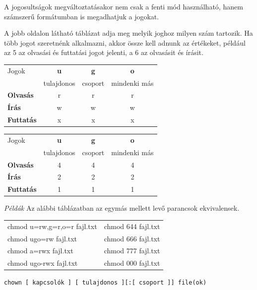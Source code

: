 A jogosultságok  megváltoztatásakor nem csak a fenti mód használható, hanem számszerű formátumban  is megadhatjuk a jogokat. 

A jobb oldalon látható táblázat adja meg melyik joghoz milyen szám tartozik. Ha több jogot szeretnénk alkalmazni, akkor össze kell adnunk az értékeket, például az 5 az olvasási és futtatási jogot jelenti, a 6 az olvasásit és írásit. 
\begin{center}
\small
\begin{tabular}{lccc}
\toprule
	Jogok 	&\bf u 		&\bf g 		&\bf o\\
	 	&tulajdonos 	&csoport	&mindenki más\\
\midrule
\bf Olvasás 	&r 		&r		&r\\
\bf Írás	&w 		&w 		&w\\
\bf Futtatás 	&x 		&x 		&x\\
\bottomrule

\end{tabular}
\hfill
\begin{tabular}{lccc}
\toprule
	Jogok 	&\bf u 		&\bf g 		&\bf o\\
	 	&tulajdonos 	&csoport	&mindenki más\\
\midrule
\bf Olvasás 	&4 		&4 		&4\\
\bf Írás	&2 		&2 		&2\\
\bf Futtatás 	&1 		&1 		&1\\
\bottomrule
\end{tabular}
\end{center}

\bigskip

\textit{Példák}
Az alábbi táblázatban az egymás mellett levő parancsok ekvivalensek.
\begin{center}
\begin{tabular}{l|l}
\toprule
chmod u=rw,g=r,o=r fajl.txt	& chmod 644 fajl.txt\\
chmod ugo=rw fajl.txt		& chmod 666 fajl.txt\\
chmod a=rwx fajl.txt		& chmod 777 fajl.txt\\
chmod ugo-rwx fajl.txt	 	& chmod 000 fajl.txt\\
\bottomrule
\end{tabular}
\end{center}
\bigskip

{
\noindent{}
\medskip

       \hfill \texttt{chown [ kapcsolók ] [ tulajdonos ][:[ csoport ]] file(ok)}
       }\bigskip
       

